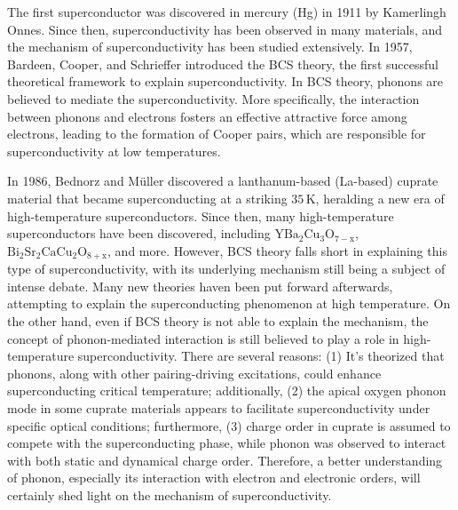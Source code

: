 \documentclass[11pt]{article}
\begin{document}
The first superconductor was discovered in mercury (Hg) in 1911 by Kamerlingh Onnes. Since then, superconductivity has been observed in many materials, and the mechanism of superconductivity has been studied extensively. In 1957, Bardeen, Cooper, and Schrieffer introduced the BCS theory, the first successful theoretical framework to explain superconductivity\cite{bardeen_theory_1957}. In BCS theory, phonons are believed to mediate the superconductivity. More specifically, the interaction between phonons and electrons fosters an effective attractive force among electrons, leading to the formation of Cooper pairs, which are responsible for superconductivity at low temperatures\cite{bardeen_theory_1957}. 

In 1986, Bednorz and Müller discovered a lanthanum-based (La-based) cuprate material that became superconducting at a striking $35\,\mathrm{K}$\cite{bednorz_possible_1986}, heralding a new era of high-temperature superconductors. Since then, many  high-temperature superconductors have been discovered, including $\mathrm{YBa_{2}Cu_{3}O_{7-x}}$\cite{wu_superconductivity_1987}, $\mathrm{Bi_2Sr_2CaCu_{2}O_{8+x}}$\cite{maeda_a_1988}, and more. However, BCS theory falls short in explaining this type of superconductivity, with its underlying mechanism still being a subject of intense debate. Many new theories haven been put forward afterwards, attempting to explain the superconducting phenomenon at high temperature. On the other hand, even if BCS theory is not able to explain the mechanism, the concept of phonon-mediated interaction is still believed to play a role in high-temperature superconductivity. There are several reasons: (1) It's theorized that phonons, along with other pairing-driving excitations, could enhance superconducting critical temperature\cite{braicovich_determining_2020}; additionally, (2) the apical oxygen phonon mode in some cuprate materials appears to facilitate superconductivity under specific optical conditions\cite{kaiser_optically_2014}; furthermore, (3) charge order in cuprate is assumed to compete with the superconducting phase, while phonon was observed to interact with both static and dynamical charge order\cite{arpaia_charge_2021,comin_resonant_2016,canosa_resonant_2014, hucker_competing_2014, chang_direct_2012,ghiringhelli_long-range_2012,wang_charge_2021,lin_strongly_2020, huang_quantum_2021,miao_incommensurate_2018,tacon_inelastic_2014,li_multiorbital_2020,braicovich_determining_2020,chaix_dispersive_2017,peng_enhanced_2020}. Therefore, a better understanding of phonon, especially its interaction with electron and electronic orders, will certainly shed light on the mechanism of superconductivity.  
\end{document}

